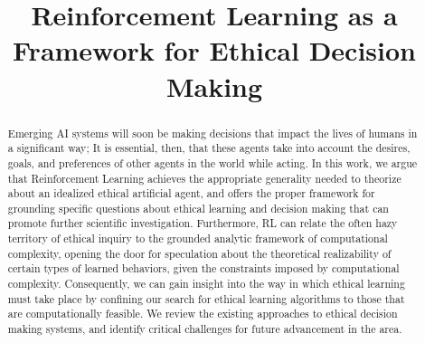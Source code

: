 \documentclass[11pt]{article}
\title{Reinforcement Learning as a Framework for Ethical Decision Making}
\author{}
\date{}                                           %
\begin{document}
\maketitle





\begin{abstract}
Emerging AI systems will soon be making decisions that impact the lives of humans in a significant way; It is essential, then, that these agents take into account the desires, goals, and preferences of other agents in the world while acting.
In this work, we argue that Reinforcement Learning achieves the appropriate generality needed to theorize about an idealized ethical artificial agent, and offers the proper framework for grounding specific questions about ethical learning and decision making that can promote further scientific investigation.
Furthermore, RL can relate the often hazy territory of ethical inquiry to the grounded analytic framework of computational complexity, opening the door for speculation about the theoretical realizability of certain types of learned behaviors, given the constraints imposed by computational complexity. Consequently, we can gain insight into the way in which ethical learning must take place by confining our search for ethical learning algorithms to those that are computationally feasible. 
We review the existing approaches to ethical decision making systems, and identify critical challenges for future advancement in the area.
\end{abstract}
\end{document}
